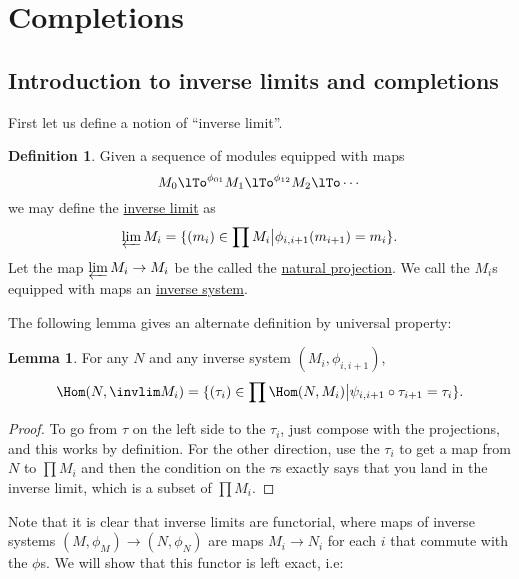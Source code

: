 \documentclass[12 pt]{article}
\theoremstyle{definition}
\newtheorem{lemma}[thm]{Lemma}
\newtheorem{defn}[thm]{Definition}
\renewcommand{\(}{\left(}
\renewcommand{\)}{\right)}
\begin{document}
\newpage




\section{Completions}

\subsection{Introduction to inverse limits and completions}

First let us define a notion of ``inverse limit''.
\begin{defn} Given a sequence of modules equipped with maps
\[M_0 \lTo^{\phi_{01}} M_1 \lTo^{\phi_{12}} M_2 \lTo \cdots\]
we may define the \underline{inverse limit} as
\[\varprojlim M_i=\{(m_i) \in \prod M_i \big| \phi_{i,i+1}(m_{i+1})=m_i\}.\]
Let the map $\varprojlim M_i \to M_i$ be the called the \underline{natural projection}. We call the $M_i$s equipped with maps an \underline{inverse system}.
\end{defn}

The following lemma gives an alternate definition by universal property:
\begin{lemma} For any $N$ and any inverse system $(M_i, \phi_{i,i+1})$,
\[\Hom(N,\invlim M_i)=\{(\tau_i) \in \prod \Hom(N,M_i) \big| \psi_{i,i+1} \circ \tau_{i+1}=\tau_i\}.\]
\end{lemma}
\begin{proof} To go from $\tau$ on the left side to the $\tau_i$, just compose with the projections, and this works by definition. For the other direction, use the $\tau_i$ to get a map from $N$ to $\prod M_i$ and then the condition on the $\tau$s exactly says that you land in the inverse limit, which is a subset of $\prod M_i$.
\end{proof}


Note that it is clear that inverse limits are functorial, where maps of inverse systems $(M,\phi_M) \to (N,\phi_N)$ are maps $M_i \to N_i$ for each $i$ that commute with the $\phi$s. We will show that this functor is left exact, i.e:
\end{document}
